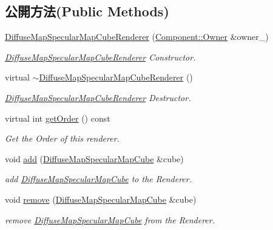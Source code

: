 \subsection*{公開方法(Public Methods)}
\begin{DoxyCompactItemize}
\item 
\hyperlink{class_i_dream_sky_1_1_diffuse_map_specular_map_cube_renderer_a65810ac056ff0200cd27e1081c41b2ae}{Diffuse\+Map\+Specular\+Map\+Cube\+Renderer} (\hyperlink{class_i_dream_sky_1_1_component_1_1_owner}{Component\+::\+Owner} \&owner\+\_\+)
\begin{DoxyCompactList}\small\item\em \hyperlink{class_i_dream_sky_1_1_diffuse_map_specular_map_cube_renderer}{Diffuse\+Map\+Specular\+Map\+Cube\+Renderer} Constructor. \end{DoxyCompactList}\item 
virtual \hyperlink{class_i_dream_sky_1_1_diffuse_map_specular_map_cube_renderer_a55c60b5f14ff8e9ad0c0280e66ee39f7}{$\sim$\+Diffuse\+Map\+Specular\+Map\+Cube\+Renderer} ()
\begin{DoxyCompactList}\small\item\em \hyperlink{class_i_dream_sky_1_1_diffuse_map_specular_map_cube_renderer}{Diffuse\+Map\+Specular\+Map\+Cube\+Renderer} Destructor. \end{DoxyCompactList}\item 
virtual int \hyperlink{class_i_dream_sky_1_1_diffuse_map_specular_map_cube_renderer_acd78d0b836cf88110dc2b2260d96a7d9}{get\+Order} () const 
\begin{DoxyCompactList}\small\item\em Get the Order of this renderer. \end{DoxyCompactList}\item 
void \hyperlink{class_i_dream_sky_1_1_diffuse_map_specular_map_cube_renderer_a5d0e7d3a1e9ba8f6110785c2a5112009}{add} (\hyperlink{class_i_dream_sky_1_1_diffuse_map_specular_map_cube}{Diffuse\+Map\+Specular\+Map\+Cube} \&cube)
\begin{DoxyCompactList}\small\item\em add \hyperlink{class_i_dream_sky_1_1_diffuse_map_specular_map_cube}{Diffuse\+Map\+Specular\+Map\+Cube} to the Renderer. \end{DoxyCompactList}\item 
void \hyperlink{class_i_dream_sky_1_1_diffuse_map_specular_map_cube_renderer_a1f74a1a086edaa7c142682c2b8648678}{remove} (\hyperlink{class_i_dream_sky_1_1_diffuse_map_specular_map_cube}{Diffuse\+Map\+Specular\+Map\+Cube} \&cube)
\begin{DoxyCompactList}\small\item\em remove \hyperlink{class_i_dream_sky_1_1_diffuse_map_specular_map_cube}{Diffuse\+Map\+Specular\+Map\+Cube} from the Renderer. \end{DoxyCompactList}\end{DoxyCompactItemize}
